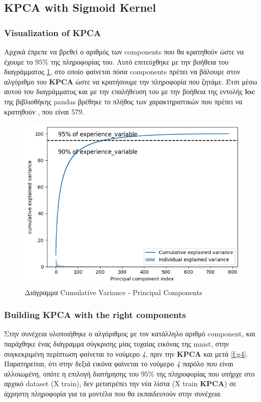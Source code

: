 \subsection{KPCA with Sigmoid Kernel}

\subsubsection{Visualization of KPCA}
Αρχικά έπρεπε να βρεθεί ο αριθμός των components που θα κρατηθούν ώστε να έχουμε το $95\%$ της πληροφορίας του. Αυτό επιτεύχθηκε με την βοήθεια του διαγράμματος \ref{f:g3}, στο οποίο φαίνεται πόσα components πρέπει να βάλουμε στον αλγόριθμο του \textbf{KPCA} ώστε να κρατήσουμε την πληροφορία που ζητάμε. Έτσι μέσω αυτού του διαγράμματος και με την επαλήθευση του με την βοήθεια της εντολής \textbf{loc} της βιβλιοθήκης pandas βρέθηκε το πλήθος των χαρακτηριστικών που πρέπει να κρατηθούν , που είναι 579.


\begin{figure}[ht]
	\centering
	\includegraphics[width=1\linewidth]{Images data1/KPCAsigmplot.png}
	\caption{ Διάγραμμα Cumulative Variance - Principal Components  }
	\label{f:g3}	
\end{figure}

\subsubsection{Building KPCA with the right components}

Στην συνέχεια υλοποιήθηκε ο αλγόριθμος με τον κατάλληλο αριθμό component, και παράχθηκε ένας διάγραμμα σύγκρισης μίας τυχαίας εικόνας της mnist, στην συγκεκριμένη περίπτωση φαίνεται το νούμερο \emph{4}, πριν την \textbf{KPCA} και μετά \ref{f:g4}. Παρατηρείται, ότι στην δεξιά εικόνα φαίνεται το νούμερο \emph{4} παρόλο που είναι αλλοιωμένη, οπότε η επιλογή διατήρησης του $95\%$ της πληροφορίας που υπήρχε στο αρχικό dataset (Χ train), δεν μετατρέπει την νέα λίστα (X train \textbf{KPCA}) σε άχρηστη πληροφορία για τα μοντέλα που θα εκπαιδευτούν στην συνέχεια.


